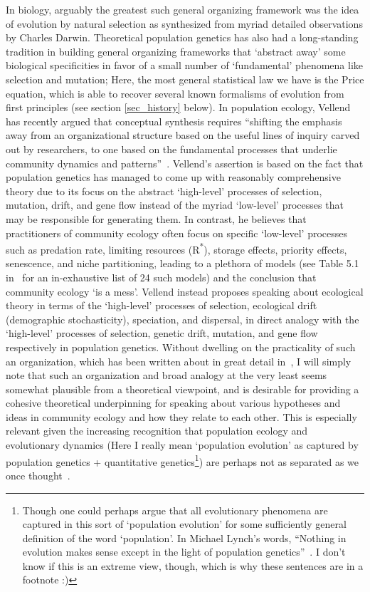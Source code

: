 In biology, arguably the greatest such general organizing framework was the idea of evolution by natural selection as synthesized from myriad detailed observations by Charles Darwin. Theoretical population genetics has also had a long-standing tradition in building general organizing frameworks that `abstract away' some biological specificities in favor of a small number of `fundamental' phenomena like selection and mutation; Here, the most general statistical law we have is the Price equation, which is able to recover several known formalisms of evolution from first principles (see section \ref{sec_history} below). In population ecology, Vellend has recently argued that conceptual synthesis requires
``shifting the emphasis away from an organizational structure based on the useful lines of
inquiry carved out by researchers, to one based on the fundamental processes that underlie community dynamics and patterns''~\citep{vellend_theory_2016}. Vellend's assertion is based on the
fact that population genetics has managed to come up  with reasonably comprehensive theory due to its focus on the abstract `high-level’ processes of selection, mutation, drift, and
gene flow instead of the myriad `low-level' processes that may be responsible for generating them. In contrast, he believes that practitioners of community ecology often focus on specific `low-level' processes such as predation rate, limiting resources (R\textsuperscript{*}), storage effects,
priority effects, senescence, and niche partitioning, leading to a plethora of models (see Table
5.1 in~\cite{vellend_theory_2016} for an in-exhaustive list of 24 such models) and the conclusion that
community ecology `is a mess'. Vellend instead proposes speaking about ecological theory in terms of the `high-level’ processes of selection, ecological drift (demographic stochasticity), speciation,
and dispersal, in direct analogy with the `high-level' processes of selection, genetic drift, mutation, and gene flow respectively in population genetics. Without dwelling on the practicality of such an organization, which has been written about in great detail in~\cite{vellend_theory_2016}, I will simply note that such an organization and broad analogy at the very least seems somewhat plausible from a theoretical viewpoint, and is desirable for providing a cohesive theoretical underpinning for speaking about various hypotheses and ideas in community ecology and how they relate to each other. This is especially relevant given the increasing recognition that population ecology and evolutionary dynamics (Here I really mean `population evolution' as captured by population genetics + quantitative genetics\footnote{Though one could perhaps argue that all evolutionary phenomena are captured in this sort of `population evolution' for some sufficiently general definition of the word `population'. In Michael Lynch's words, ``Nothing in evolution makes sense except in the light of population genetics''~\citep{lynch_origins_2007}. I don't know if this is an extreme view, though, which is why these sentences are in a footnote :)}) are perhaps not as separated as we once thought~\citep{coulson_putting_2006,metcalf_why_2007,schoener_newest_2011,kokko_can_2017,lion_theoretical_2018,govaert_eco-evolutionary_2019,svensson_eco-evolutionary_2019}.

